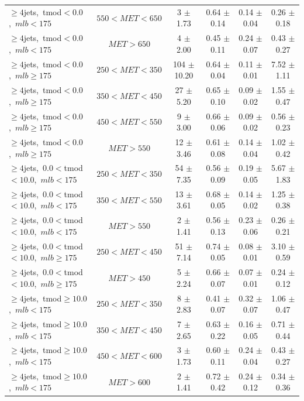 \begin{table}
\begin{tabular}{|l|c|c|c|c|c|}
 $\ge4$jets,~tmod$<0.0$,~$mlb<175$         & $550<MET<650$ & 3 $\pm$ 1.73    & 0.64 $\pm$ 0.14  & 0.14 $\pm$ 0.04 & 0.26 $\pm$ 0.18 \\
 $\ge4$jets,~tmod$<0.0$,~$mlb<175$         & $MET>650$     & 4 $\pm$ 2.00    & 0.45 $\pm$ 0.11  & 0.24 $\pm$ 0.07 & 0.43 $\pm$ 0.27 \\
\hline
 $\ge4$jets,~tmod$<0.0$,~$mlb\ge175$       & $250<MET<350$ & 104 $\pm$ 10.20 & 0.64 $\pm$ 0.04  & 0.11 $\pm$ 0.01 & 7.52 $\pm$ 1.11 \\
 $\ge4$jets,~tmod$<0.0$,~$mlb\ge175$       & $350<MET<450$ & 27 $\pm$ 5.20   & 0.65 $\pm$ 0.10  & 0.09 $\pm$ 0.02 & 1.55 $\pm$ 0.47 \\
 $\ge4$jets,~tmod$<0.0$,~$mlb\ge175$       & $450<MET<550$ & 9 $\pm$ 3.00    & 0.66 $\pm$ 0.06  & 0.09 $\pm$ 0.02 & 0.56 $\pm$ 0.23 \\
 $\ge4$jets,~tmod$<0.0$,~$mlb\ge175$       & $MET>550$     & 12 $\pm$ 3.46   & 0.61 $\pm$ 0.08  & 0.14 $\pm$ 0.04 & 1.02 $\pm$ 0.42 \\
\hline
 $\ge4$jets,~$0.0<$tmod$<10.0$,~$mlb<175$  & $250<MET<350$ & 54 $\pm$ 7.35   & 0.56 $\pm$ 0.09  & 0.19 $\pm$ 0.05 & 5.67 $\pm$ 1.83 \\
 $\ge4$jets,~$0.0<$tmod$<10.0$,~$mlb<175$  & $350<MET<550$ & 13 $\pm$ 3.61   & 0.68 $\pm$ 0.05  & 0.14 $\pm$ 0.02 & 1.25 $\pm$ 0.38 \\
 $\ge4$jets,~$0.0<$tmod$<10.0$,~$mlb<175$  & $MET>550$     & 2 $\pm$ 1.41    & 0.56 $\pm$ 0.13  & 0.23 $\pm$ 0.06 & 0.26 $\pm$ 0.21 \\
\hline
 $\ge4$jets,~$0.0<$tmod$<10.0$,~$mlb\ge175$& $250<MET<450$ & 51 $\pm$ 7.14   & 0.74 $\pm$ 0.05  & 0.08 $\pm$ 0.01 & 3.10 $\pm$ 0.59 \\
 $\ge4$jets,~$0.0<$tmod$<10.0$,~$mlb\ge175$& $MET>450$     & 5 $\pm$ 2.24    & 0.66 $\pm$ 0.07  & 0.07 $\pm$ 0.01 & 0.24 $\pm$ 0.12 \\
\hline
 $\ge4$jets,~tmod$\ge10.0$,~$mlb<175$      & $250<MET<350$ & 8 $\pm$ 2.83    & 0.41 $\pm$ 0.07  & 0.32 $\pm$ 0.07 & 1.06 $\pm$ 0.47 \\
 $\ge4$jets,~tmod$\ge10.0$,~$mlb<175$      & $350<MET<450$ & 7 $\pm$ 2.65    & 0.63 $\pm$ 0.22  & 0.16 $\pm$ 0.05 & 0.71 $\pm$ 0.44 \\
 $\ge4$jets,~tmod$\ge10.0$,~$mlb<175$      & $450<MET<600$ & 3 $\pm$ 1.73    & 0.60 $\pm$ 0.11  & 0.24 $\pm$ 0.04 & 0.43 $\pm$ 0.27 \\
 $\ge4$jets,~tmod$\ge10.0$,~$mlb<175$      & $MET>600$     & 2 $\pm$ 1.41    & 0.72 $\pm$ 0.42  & 0.24 $\pm$ 0.12 & 0.34 $\pm$ 0.36 \\

\end{tabular}
\end{table}
